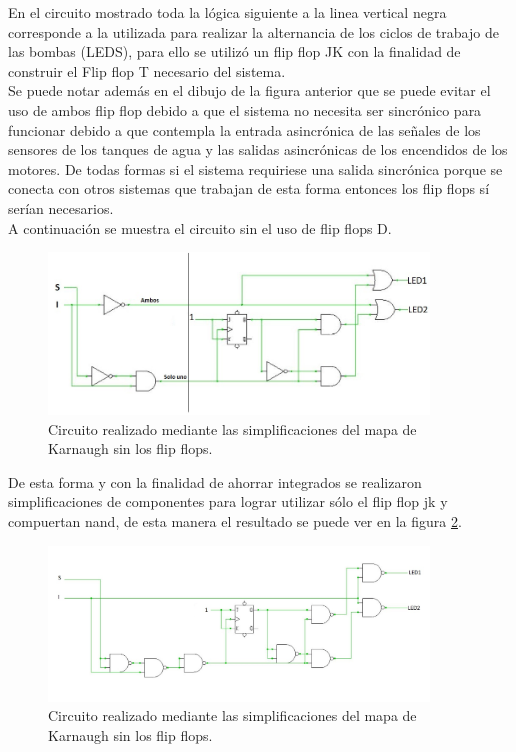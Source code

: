 %
\noindent
En el circuito mostrado toda la lógica siguiente a la linea vertical negra corresponde a la utilizada para realizar la alternancia de los ciclos de trabajo de las bombas (LEDS), para ello se utilizó un flip flop JK con la finalidad de construir el Flip flop T necesario del sistema.\\
Se puede notar además en el dibujo de la figura anterior que se puede evitar el uso de ambos flip flop debido a que el sistema no necesita ser sincrónico para funcionar debido a que contempla la entrada asincrónica de las señales de los sensores de los tanques de agua y las salidas asincrónicas de los encendidos de los motores. De todas formas si el sistema requiriese una salida sincrónica porque se conecta con otros sistemas que trabajan de esta forma entonces los flip flops sí serían necesarios. \\
A continuación se muestra el circuito sin el uso de flip flops D.
%
\begin{figure}[H]
    \centering
    \includegraphics[width=0.9\textwidth]{figs/Ej1/circuito_facil.JPG} %
    \caption{Circuito realizado mediante las simplificaciones del mapa de Karnaugh sin los flip flops.}
    \label{ej1_circuito2.}
\end{figure}
%
De esta forma y con la finalidad de ahorrar integrados se realizaron simplificaciones de componentes para lograr utilizar sólo el flip flop jk y compuertan nand, de esta manera el resultado se puede ver en la figura \ref{ej1_circuito3.}.
%
\begin{figure}[H]
    \centering
    \includegraphics[width=0.9\textwidth]{figs/Ej1/circuito.JPG} %
    \caption{Circuito realizado mediante las simplificaciones del mapa de Karnaugh sin los flip flops.}
    \label{ej1_circuito3.}
\end{figure}
